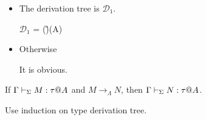 \begin{itemize}
	\newcommand{\MC}[1]{\mathcal{#1}}
	\item \TGen
	      	      
	      The derivation tree is $\MC{D}_1$.
	      	      
	      $\MC{D}_1$ = 
	      { \andalso \alpha \notin \FTV(\G)\cup\FTV(A)}
	      	      
	\item Otherwise
	      	      
	      It is obvious.
\end{itemize}

\begin{theorem}
	If $\G\V M:\tau@A$ and $M \longrightarrow_{\Lambda} N$, then $\G\V N:\tau@A$.
\end{theorem}

Use induction on type derivation tree.

